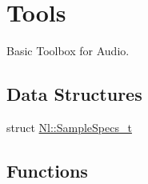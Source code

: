 \hypertarget{group__Tools}{}\section{Tools}
\label{group__Tools}


Basic Toolbox for Audio.  


\subsection*{Data Structures}
\begin{DoxyCompactItemize}
\item 
struct \hyperlink{structNl_1_1SampleSpecs__t}{Nl\+::\+Sample\+Specs\+\_\+t}
\end{DoxyCompactItemize}
\subsection*{Functions}
